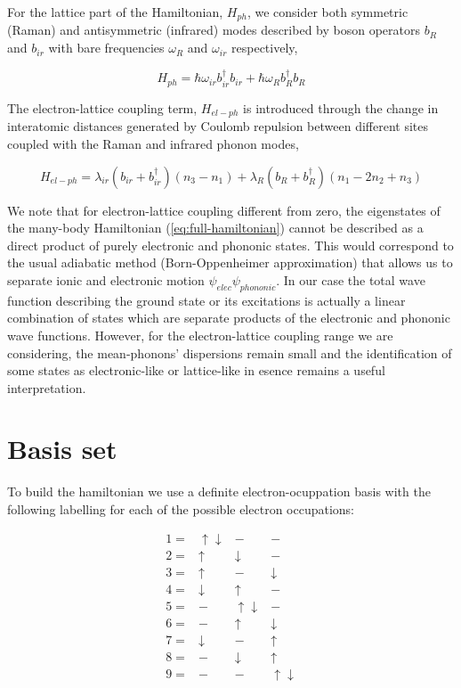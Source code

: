 For the lattice  part of the Hamiltonian, $H_{ph}$, we consider both symmetric (Raman) and antisymmetric (infrared) modes described by boson operators $b_R$ and $b_{ir}$ with bare frequencies $\omega_R$ and $\omega_{ir}$ respectively,
 
\begin{equation}\label{eq:phonon-part}
H_{ph} = \hbar \omega_{ir}b_{ir}^\dagger b_{ir} + \hbar \omega_R b_R^\dagger b_R
\end{equation}
 
The electron-lattice coupling term, $H_{el-ph}$ is introduced through the change in interatomic distances generated by Coulomb repulsion between different sites coupled with the Raman and infrared phonon modes,
 
\begin{equation}\label{eq:coupling-part}
H_{el-ph} = \lambda_{ir}(b_{ir} + b_{ir}^\dagger)(n_3 - n_1) + \lambda_R (b_R + b_R^\dagger)(n_1 - 2n_2 + n_3)
\end{equation}


We note that for electron-lattice coupling different from zero, the eigenstates of the many-body Hamiltonian (\ref{eq:full-hamiltonian}) cannot be described as a direct product of purely electronic and phononic states. 
This would correspond to the usual adiabatic method (Born-Oppenheimer approximation) that allows us to separate ionic and electronic motion $\psi_{elec}\psi_{phononic}$. 
In our case the total wave function describing the ground state or its excitations is actually a linear combination of states which are separate products of the electronic and phononic wave functions. 
However, for the electron-lattice coupling range we are considering, the mean-phonons' dispersions remain small and the identification of some states as electronic-like or lattice-like in esence remains a useful interpretation.

\section{Basis set}

To build the hamiltonian we use a definite electron-ocuppation basis with the following labelling for each of the possible electron occupations:

\begin{equation}\label{eq:basis-set}\begin{array}{cccc}
1= & \uparrow \downarrow & - & - \\
2= & \uparrow & \downarrow & - \\
3= & \uparrow & - & \downarrow \\
4= & \downarrow & \uparrow & - \\
5= & - & \uparrow \downarrow & - \\
6= & - & \uparrow & \downarrow \\
7= & \downarrow & - & \uparrow \\
8= & - & \downarrow & \uparrow \\
9= & - & - & \uparrow \downarrow \end{array}\end{equation}


